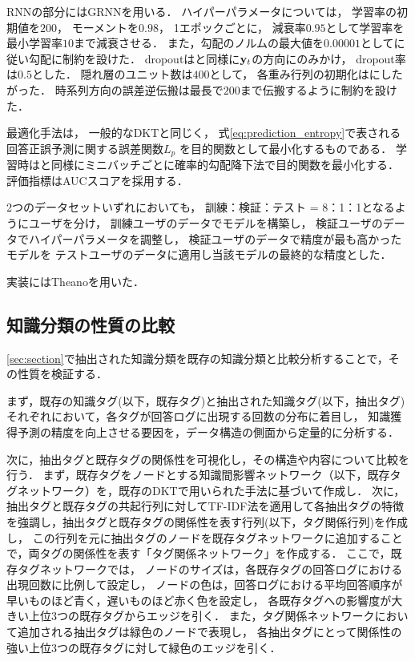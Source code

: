 RNNの部分にはGRNNを用いる．
ハイパーパラメータについては，
学習率の初期値を$200$，
モーメントを$0.98$，
1エポックごとに，
減衰率$0.95$として学習率を最小学習率$10$まで減衰させる．
また，勾配のノルムの最大値を$0.00001$として\cite{pascanu2013difficulty}に従い勾配に制約を設けた．
dropoutは\cite{piech2015deep}と同様に${\bf y}_t$の方向にのみかけ，
dropout率は$0.5$とした．
隠れ層のユニット数は$400$として，
各重み行列の初期化は\cite{glorot2010understanding}にしたがった．
時系列方向の誤差逆伝搬は最長で$200$まで伝搬するように制約を設けた．

最適化手法は，
一般的なDKTと同じく，
式\ref{eq:prediction_entropy}で表される回答正誤予測に関する誤差関数$L_p$
を目的関数として最小化するものである．
学習時は\cite{piech2015deep}と同様にミニバッチごとに確率的勾配降下法で目的関数を最小化する．
評価指標はAUCスコアを採用する．

2つのデータセットいずれにおいても，
訓練：検証：テスト = 8：1：1となるようにユーザを分け，
訓練ユーザのデータでモデルを構築し，
検証ユーザのデータでハイパーパラメータを調整し， 
検証ユーザのデータで精度が最も高かったモデルを
テストユーザのデータに適用し当該モデルの最終的な精度とした．

実装にはTheanoを用いた．


\subsection{知識分類の性質の比較}

\ref{sec:section}で抽出された知識分類を既存の知識分類と比較分析することで，その性質を検証する．

まず，既存の知識タグ(以下，既存タグ)と抽出された知識タグ(以下，抽出タグ)それぞれにおいて，各タグが回答ログに出現する回数の分布に着目し，
知識獲得予測の精度を向上させる要因を，データ構造の側面から定量的に分析する．

次に，抽出タグと既存タグの関係性を可視化し，その構造や内容について比較を行う．
まず，既存タグをノードとする知識間影響ネットワーク（以下，既存タグネットワーク）を，既存のDKTで用いられた手法に基づいて作成し．
次に，抽出タグと既存タグの共起行列に対してTF-IDF法を適用して各抽出タグの特徴を強調し，抽出タグと既存タグの関係性を表す行列(以下，タグ関係行列)を作成し，
この行列を元に抽出タグのノードを既存タグネットワークに追加することで，両タグの関係性を表す「タグ関係ネットワーク」を作成する．
ここで，既存タグネットワークでは，
ノードのサイズは，各既存タグの回答ログにおける出現回数に比例して設定し，
ノードの色は，回答ログにおける平均回答順序が早いものほど青く，遅いものほど赤く色を設定し，
各既存タグへの影響度が大きい上位3つの既存タグからエッジを引く．
また，タグ関係ネットワークにおいて追加される抽出タグは緑色のノードで表現し，
各抽出タグにとって関係性の強い上位3つの既存タグに対して緑色のエッジを引く．

